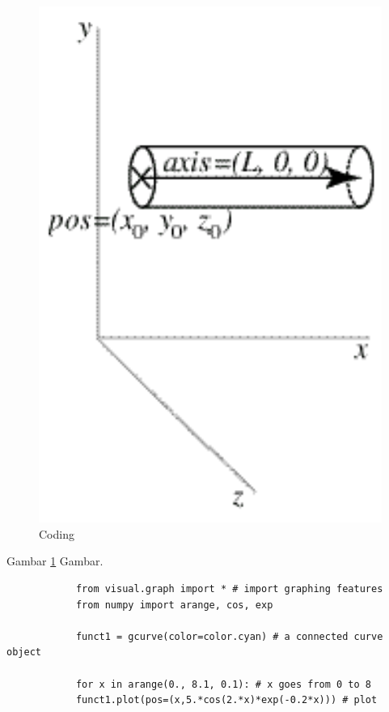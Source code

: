 		\begin{figure}[ht]
					\centerline{\includegraphics[width=1\textwidth]{figures/OSS.jpg}}
				\caption{Coding}
			\label{Vphython}
		\end{figure}
	Gambar \ref{Vphython} Gambar.
		\begin{verbatim}
			from visual.graph import * # import graphing features
			from numpy import arange, cos, exp

			funct1 = gcurve(color=color.cyan) # a connected curve object

			for x in arange(0., 8.1, 0.1): # x goes from 0 to 8
			funct1.plot(pos=(x,5.*cos(2.*x)*exp(-0.2*x))) # plot
		\end{verbatim}
		
\cite{scherer2000vpython}
\cite{sherwood2011vpython}
\cite{roberts2004teaching}
\cite{marciuc2016using}

